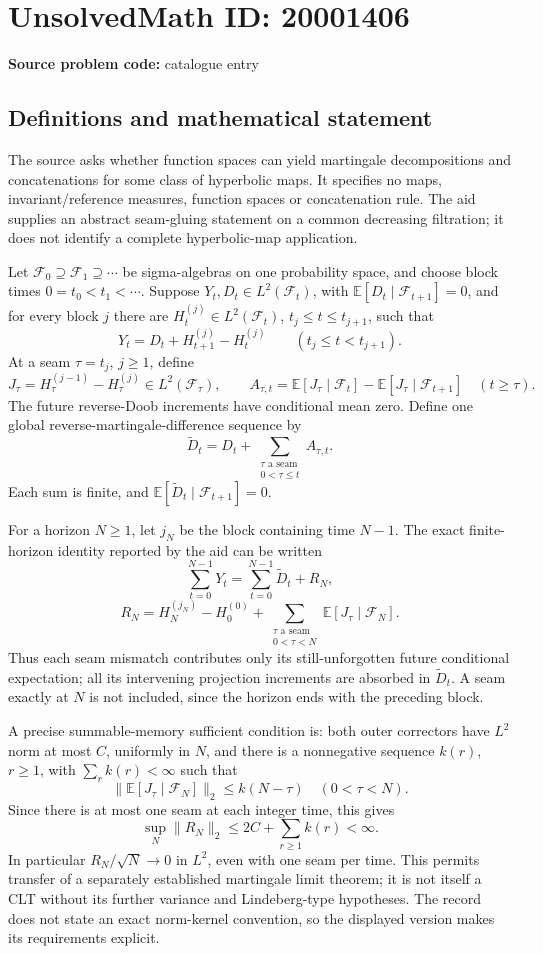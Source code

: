 \documentclass[11pt]{article}
\newcommand{\E}{\mathbb{E}}
\begin{document}
\section*{UnsolvedMath ID: 20001406}
\textbf{Source problem code:} catalogue entry
\subsection{Definitions and mathematical statement}
The source asks whether function spaces can yield martingale decompositions and concatenations for some class of hyperbolic maps. It specifies no maps, invariant/reference measures, function spaces or concatenation rule. The aid supplies an abstract seam-gluing statement on a common decreasing filtration; it does not identify a complete hyperbolic-map application.

Let \(\mathcal F_0\supseteq\mathcal F_1\supseteq\cdots\) be sigma-algebras on one probability space, and choose block times \(0=t_0<t_1<\cdots\). Suppose \(Y_t,D_t\in L^2(\mathcal F_t)\), with
\(\E[D_t\mid\mathcal F_{t+1}]=0\), and for every block \(j\) there are \(H_t^{(j)}\in L^2(\mathcal F_t)\), \(t_j\leq t\leq t_{j+1}\), such that
\[
 Y_t=D_t+H_{t+1}^{(j)}-H_t^{(j)}\qquad(t_j\leq t<t_{j+1}).
\]
At a seam \(\tau=t_j\), \(j\geq1\), define
\[
 J_\tau=H_\tau^{(j-1)}-H_\tau^{(j)}\in L^2(\mathcal F_\tau),\qquad
 A_{\tau,t}=\E[J_\tau\mid\mathcal F_t]-\E[J_\tau\mid\mathcal F_{t+1}]\quad(t\geq\tau).
\]
The future reverse-Doob increments have conditional mean zero. Define one global reverse-martingale-difference sequence by
\[
 \widetilde D_t=D_t+\sum_{\substack{\tau\text{ a seam}\\0<\tau\leq t}}A_{\tau,t}.
\]
Each sum is finite, and \(\E[\widetilde D_t\mid\mathcal F_{t+1}]=0\).

For a horizon \(N\geq1\), let \(j_N\) be the block containing time \(N-1\). The exact finite-horizon identity reported by the aid can be written
\[
 \sum_{t=0}^{N-1}Y_t
 =\sum_{t=0}^{N-1}\widetilde D_t+R_N,
\]
\[
 R_N=H_N^{(j_N)}-H_0^{(0)}
 +\sum_{\substack{\tau\text{ a seam}\\0<\tau<N}}
 \E[J_\tau\mid\mathcal F_N].
\]
Thus each seam mismatch contributes only its still-unforgotten future conditional expectation; all its intervening projection increments are absorbed in \(\widetilde D_t\). A seam exactly at \(N\) is not included, since the horizon ends with the preceding block.

A precise summable-memory sufficient condition is: both outer correctors have \(L^2\) norm at most \(C\), uniformly in \(N\), and there is a nonnegative sequence \(k(r)\), \(r\geq1\), with \(\sum_rk(r)<\infty\) such that
\[
 \|\E[J_\tau\mid\mathcal F_N]\|_2\leq k(N-\tau)\quad(0<\tau<N).
\]
Since there is at most one seam at each integer time, this gives
\[
 \sup_N\|R_N\|_2\leq2C+\sum_{r\geq1}k(r)<\infty.
\]
In particular \(R_N/\sqrt N\to0\) in \(L^2\), even with one seam per time. This permits transfer of a separately established martingale limit theorem; it is not itself a CLT without its further variance and Lindeberg-type hypotheses. The record does not state an exact norm-kernel convention, so the displayed version makes its requirements explicit.
\end{document}
